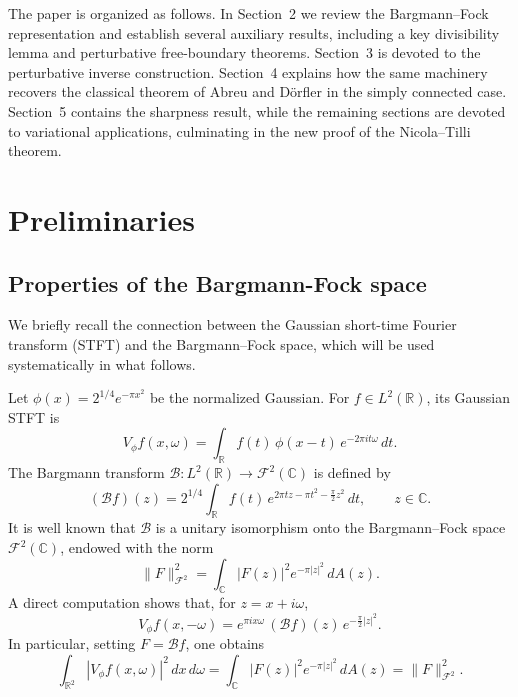 \documentclass[a4paper,11pt,reqno]{amsart}
\numberwithin{equation}{section}
\theoremstyle{plain} %
\theoremstyle{definition} %
\theoremstyle{remark}
\begin{document}
The paper is organized as follows. In Section~2 we review the Bargmann--Fock representation and establish several auxiliary results, including a key divisibility lemma and perturbative free-boundary theorems. Section~3 is devoted to the perturbative inverse construction. Section~4 explains how the same machinery recovers the classical theorem of Abreu and Dörfler in the simply connected case. Section~5 contains the sharpness result, while the remaining sections are devoted to variational applications, culminating in the new proof of the Nicola--Tilli theorem.


\section{Preliminaries}

\subsection{Properties of the Bargmann-Fock space} We briefly recall the connection between the Gaussian short-time Fourier transform
(STFT) and the Bargmann--Fock space, which will be used systematically in what follows.

\medskip

Let $\phi(x) = 2^{1/4} e^{-\pi x^2}$ be the normalized Gaussian. For $f \in L^2(\mathbb{R})$, its Gaussian STFT is
\begin{equation}\label{eq:STFT}
V_\phi f(x,\omega)
= \int_{\mathbb{R}} f(t)\, \phi(x-t)\, e^{-2\pi i t \omega}\, dt.
\end{equation}
The Bargmann transform
$\mathcal{B} : L^2(\mathbb{R}) \to \mathcal{F}^2(\mathbb{C})$ is defined by
\begin{equation}\label{eq:Bargmann}
(\mathcal{B}f)(z)
= 2^{1/4} \int_{\mathbb{R}} f(t)\, e^{2\pi t z - \pi t^2 - \frac{\pi}{2} z^2}\, dt,
\qquad z \in \mathbb{C}.
\end{equation}
It is well known that $\mathcal{B}$ is a unitary isomorphism onto the Bargmann--Fock
space $\mathcal{F}^2(\mathbb{C})$, endowed with the norm
\[
\|F\|_{\mathcal{F}^2}^2
= \int_{\mathbb{C}} |F(z)|^2 e^{-\pi |z|^2} \, dA(z).
\]
A direct computation shows that, for $z = x + i\omega$,
\begin{equation}\label{eq:STFT-B}
V_\phi f(x,-\omega)
= e^{\pi i x \omega}\, (\mathcal{B}f)(z)\, e^{-\frac{\pi}{2}|z|^2}.
\end{equation}
In particular, setting $F = \mathcal{B}f$, one obtains
\begin{equation}\label{eq:energy}
\int_{\mathbb{R}^2} |V_\phi f(x,\omega)|^2 \, dx\, d\omega
= \int_{\mathbb{C}} |F(z)|^2 e^{-\pi |z|^2} \, dA(z)
= \|F\|_{\mathcal{F}^2}^2.
\end{equation}
\end{document}
